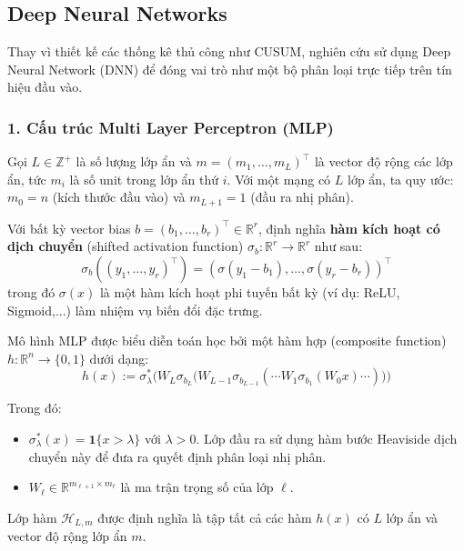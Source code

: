 \subsection{Deep Neural Networks}

Thay vì thiết kế các thống kê thủ công như CUSUM, 
nghiên cứu sử dụng Deep Neural Network (DNN) để đóng vai trò như một bộ phân loại trực tiếp trên tín hiệu đầu vào.

\subsubsection*{1. Cấu trúc Multi Layer Perceptron (MLP)}

Gọi $L \in \mathbb{Z}^+$ là số lượng lớp ẩn và $m = (m_1, \dots, m_L)^\top$ là vector độ rộng các lớp ẩn, tức $m_i$ là số unit trong lớp ẩn thứ $i$. 
Với một mạng có $L$ lớp ẩn, ta quy ước: $m_0 = n$ (kích thước đầu vào) và $m_{L+1} = 1$ (đầu ra nhị phân).

Với bất kỳ vector bias $b = (b_1, \dots, b_r)^\top \in \mathbb{R}^r$, định nghĩa \textbf{hàm kích hoạt có dịch chuyển} (shifted activation function) $\sigma_b : \mathbb{R}^r \rightarrow \mathbb{R}^r$ như sau:
\begin{equation*}
    \sigma_b((y_1, \dots, y_r)^\top) = (\sigma(y_1-b_1), \dots, \sigma(y_r-b_r))^\top
\end{equation*}
trong đó $\sigma(x)$ là một hàm kích hoạt phi tuyến bất kỳ (ví dụ: ReLU, Sigmoid,...) làm nhiệm vụ biến đổi đặc trưng.

Mô hình MLP được biểu diễn toán học bởi một hàm hợp (composite function) $h: \mathbb{R}^n \rightarrow \{0,1\}$ dưới dạng:
\begin{equation}
    h(x) := \sigma_\lambda^* \Big( W_L \sigma_{b_L} \big( W_{L-1}\sigma_{b_{L-1}} ( \cdots W_1\sigma_{b_1}(W_0x) \cdots ) \big) \Big)
\end{equation}

Trong đó:
\begin{itemize}
    \item $\sigma_\lambda^*(x) = \mathbf{1}\{x > \lambda\}$ với $\lambda > 0$. Lớp đầu ra sử dụng hàm bước Heaviside dịch chuyển này để đưa ra quyết định phân loại nhị phân.
    \item $W_\ell \in \mathbb{R}^{m_{\ell+1} \times m_\ell}$ là ma trận trọng số của lớp $\ell$.
\end{itemize}

Lớp hàm $\mathcal{H}_{L,m}$ được định nghĩa là tập tất cả các hàm $h(x)$ có $L$ lớp ẩn và vector độ rộng lớp ẩn $m$.

